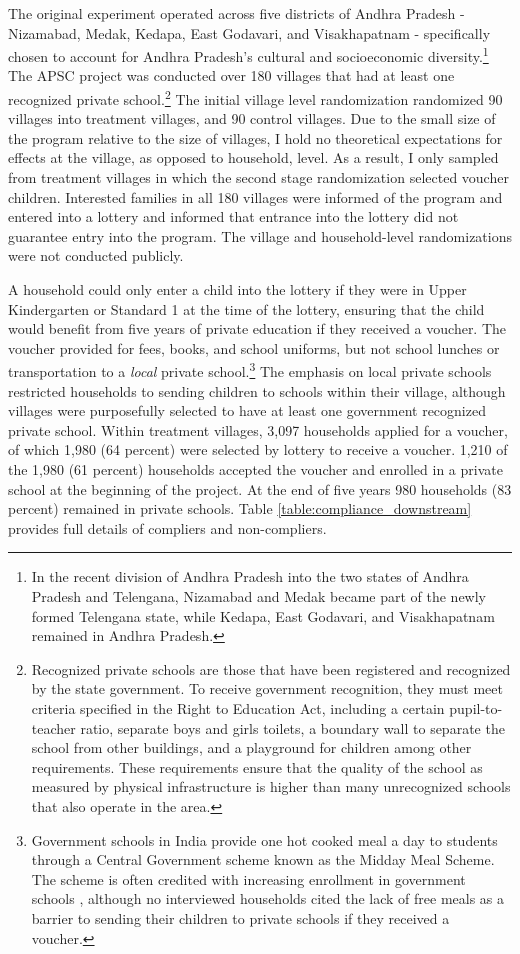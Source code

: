 \documentclass[hidelinks, 12pt, titlepage]{article}
\begin{document}
		The original experiment operated across five districts of Andhra Pradesh - Nizamabad, Medak, Kedapa, East Godavari, and Visakhapatnam - specifically chosen to account for Andhra Pradesh's cultural and socioeconomic diversity.\footnote{In the recent division of Andhra Pradesh into the two states of Andhra Pradesh and Telengana, Nizamabad and Medak became part of the newly formed Telengana state, while Kedapa, East Godavari, and Visakhapatnam remained in Andhra Pradesh.}  The APSC project was conducted over 180 villages that had at least one recognized private school.\footnote{Recognized private schools are those that have been registered and recognized by the state government.  To receive government recognition, they must meet criteria specified in the Right to Education Act, including a certain pupil-to-teacher ratio, separate boys and girls toilets, a boundary wall to separate the school from other buildings, and a playground for children among other requirements.  These requirements ensure that the quality of the school as measured by physical infrastructure is higher than many unrecognized schools that also operate in the area.}  The initial village level randomization randomized 90 villages into treatment villages, and 90 control villages.  Due to the small size of the program relative to the size of villages, I hold no theoretical expectations for effects at the village, as opposed to household, level.  As a result, I only sampled from treatment villages in which the second stage randomization selected voucher children.  Interested families in all 180 villages were informed of the program and entered into a lottery and informed that entrance into the lottery did not guarantee entry into the program.  The village and household-level randomizations were not conducted publicly.

		A household could only enter a child into the lottery if they were in Upper Kindergarten or Standard 1 at the time of the lottery, ensuring that the child would benefit from five years of private education if they received a voucher.  The voucher provided for fees, books, and school uniforms, but not school lunches or transportation to a \emph{local} private school.\footnote{Government schools in India provide one hot cooked meal a day to students through a Central Government scheme known as the Midday Meal Scheme.  The scheme is often credited with increasing enrollment in government schools \citep{Dreze2001}, although no interviewed households cited the lack of free meals as a barrier to sending their children to private schools if they received a voucher.}  The emphasis on local private schools restricted households to sending children to schools within their village, although villages were purposefully selected to have at least one government recognized private school.  Within treatment villages, 3,097 households applied for a voucher, of which 1,980 (64 percent) were selected by lottery to receive a voucher.  1,210 of the 1,980 (61 percent) households accepted the voucher and enrolled in a private school at the beginning of the project. At the end of five years 980 households (83 percent) remained in private schools.  Table \ref{table:compliance_downstream} provides full details of compliers and non-compliers.
\end{document}

